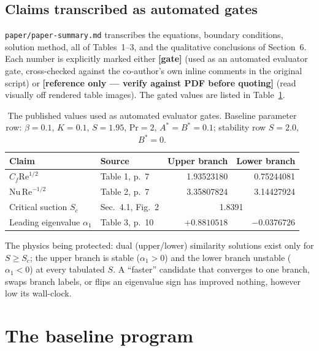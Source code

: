 \documentclass[11pt,a4paper]{article}
\newcommand{\code}[1]{\texttt{\small #1}}
\begin{document}
\subsection{Claims transcribed as automated gates}
\code{paper/paper-summary.md} transcribes the equations, boundary conditions, solution
method, all of Tables~1--3, and the qualitative conclusions of Section~6. Each number is
explicitly marked either \textbf{[gate]} (used as an automated evaluator gate,
cross-checked against the co-author's own inline comments in the original script) or
\textbf{[reference only --- verify against PDF before quoting]} (read visually off rendered
table images). The gated values are listed in Table~\ref{tab:gates}.

\begin{table}[ht]
\centering
\caption{The published values used as automated evaluator gates. Baseline parameter row:
$\beta=0.1$, $K=0.1$, $S=1.95$, $\mathrm{Pr}=2$, $A^{*}=B^{*}=0.1$; stability row $S=2.0$,
$B^{*}=0$.}
\label{tab:gates}
\small
\begin{tabular}{@{}llrr@{}}
\toprule
\textbf{Claim} & \textbf{Source} & \textbf{Upper branch} & \textbf{Lower branch} \\
\midrule
$C_f \mathrm{Re}^{1/2}$          & Table 1, p.~7  & 1.93523180 & 0.75244081 \\
$\mathrm{Nu}\,\mathrm{Re}^{-1/2}$ & Table 2, p.~7  & 3.35807824 & 3.14427924 \\
Critical suction $S_c$            & Sec.~4.1, Fig.~2 & \multicolumn{2}{c}{1.8391} \\
Leading eigenvalue $\alpha_1$     & Table 3, p.~10 & $+0.8810518$ & $-0.0376726$ \\
\bottomrule
\end{tabular}
\end{table}

\noindent The physics being protected: dual (upper/lower) similarity solutions exist only
for $S\geq S_c$; the upper branch is stable ($\alpha_1>0$) and the lower branch unstable
($\alpha_1<0$) at every tabulated $S$. A ``faster'' candidate that converges to one branch,
swaps branch labels, or flips an eigenvalue sign has improved nothing, however low its
wall-clock.

\section{The baseline program}
\end{document}
